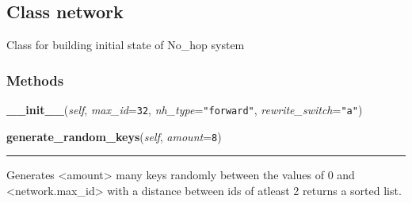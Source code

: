 \subsection{Class network}

    \label{initialize_system:No_hop_Network:network}
Class for building initial state of No\_hop system



  \subsubsection{Methods}

    \label{initialize_system:No_hop_Network:network:__init__}

    \vspace{0.5ex}

\hspace{.8\funcindent}\begin{boxedminipage}{\funcwidth}

    \raggedright \textbf{\_\_init\_\_}(\textit{self}, \textit{max\_id}={\tt 32}, \textit{nh\_type}={\tt "forward"}, \textit{rewrite\_switch}={\tt "a"})

\setlength{\parskip}{2ex}
\setlength{\parskip}{1ex}
    \end{boxedminipage}

    \label{initialize_system:No_hop_Network:network:generate_random_keys}

    \vspace{0.5ex}

\hspace{.8\funcindent}\begin{boxedminipage}{\funcwidth}

    \raggedright \textbf{generate\_random\_keys}(\textit{self}, \textit{amount}={\tt 8})

    \vspace{-1.5ex}

    \rule{\textwidth}{0.5\fboxrule}
\setlength{\parskip}{2ex}
    Generates {\textless}amount{\textgreater} many keys randomly between 
    the values of 0 and {\textless}network.max\_id{\textgreater} with a 
    distance between ids of atleast 2 returns a sorted list.

\setlength{\parskip}{1ex}
    \end{boxedminipage}

